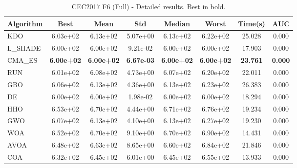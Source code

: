 \begin{table}[H]
\centering\small
\caption{CEC2017 F6 (Full) - Detailed results. Best in bold.}
\label{tab:cec2017_F6}
\begin{tabular}{lccccccc}
\toprule
\textbf{Algorithm} & \textbf{Best} & \textbf{Mean} & \textbf{Std} & \textbf{Median} & \textbf{Worst} & \textbf{Time(s)} & \textbf{AUC} \\
\midrule
KDO & 6.03e+02 & 6.13e+02 & 5.07e+00 & 6.13e+02 & 6.22e+02 & 25.028 & 0.000 \\
L_SHADE & 6.00e+02 & 6.00e+02 & 9.21e-02 & 6.00e+02 & 6.00e+02 & 17.903 & 0.000 \\
CMA_ES & \textbf{6.00e+02} & \textbf{6.00e+02} & \textbf{6.67e-03} & \textbf{6.00e+02} & \textbf{6.00e+02} & \textbf{23.761} & \textbf{0.000} \\
RUN & 6.01e+02 & 6.08e+02 & 4.73e+00 & 6.07e+02 & 6.20e+02 & 22.011 & 0.000 \\
GBO & 6.06e+02 & 6.13e+02 & 4.36e+00 & 6.13e+02 & 6.23e+02 & 26.383 & 0.000 \\
DE & 6.00e+02 & 6.00e+02 & 1.98e-02 & 6.00e+02 & 6.00e+02 & 18.294 & 0.000 \\
HHO & 6.53e+02 & 6.70e+02 & 4.44e+00 & 6.71e+02 & 6.76e+02 & 19.234 & 0.000 \\
GWO & 6.07e+02 & 6.13e+02 & 4.10e+00 & 6.13e+02 & 6.27e+02 & 19.230 & 0.000 \\
WOA & 6.52e+02 & 6.70e+02 & 9.10e+00 & 6.70e+02 & 6.90e+02 & 14.431 & 0.000 \\
AVOA & 6.48e+02 & 6.63e+02 & 8.65e+00 & 6.60e+02 & 6.84e+02 & 21.846 & 0.000 \\
COA & 6.32e+02 & 6.45e+02 & 6.01e+00 & 6.45e+02 & 6.55e+02 & 13.933 & 0.000 \\
\bottomrule
\end{tabular}
\end{table}
